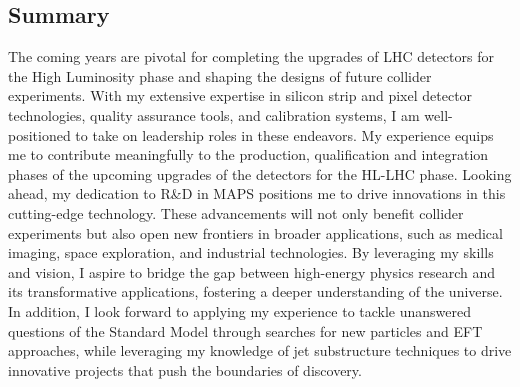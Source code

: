 {\begin{flushleft}
\vspace{\baselineskip}
\section{Summary} 
\vspace{\baselineskip}
The coming years are pivotal for completing the upgrades of LHC detectors for the High Luminosity phase and shaping the designs of future collider experiments. With my extensive expertise in silicon strip and pixel detector technologies, quality assurance tools, and calibration systems, I am well-positioned to take on leadership roles in these endeavors. My experience equips me to contribute meaningfully to the production, qualification and integration phases of the upcoming upgrades of the detectors for the HL-LHC phase.
Looking ahead, my dedication to R\&D in MAPS positions me to drive innovations in this cutting-edge technology. These advancements will not only benefit collider experiments but also open new frontiers in broader applications, such as medical imaging, space exploration, and industrial technologies. By leveraging my skills and vision, I aspire to bridge the gap between high-energy physics research and its transformative applications, fostering a deeper understanding of the universe.
In addition, I look forward to applying my experience to tackle unanswered questions of the Standard Model through searches for new particles and EFT approaches, while leveraging my knowledge of jet substructure techniques to drive innovative projects that push the boundaries of discovery.

\end{flushleft}
}
